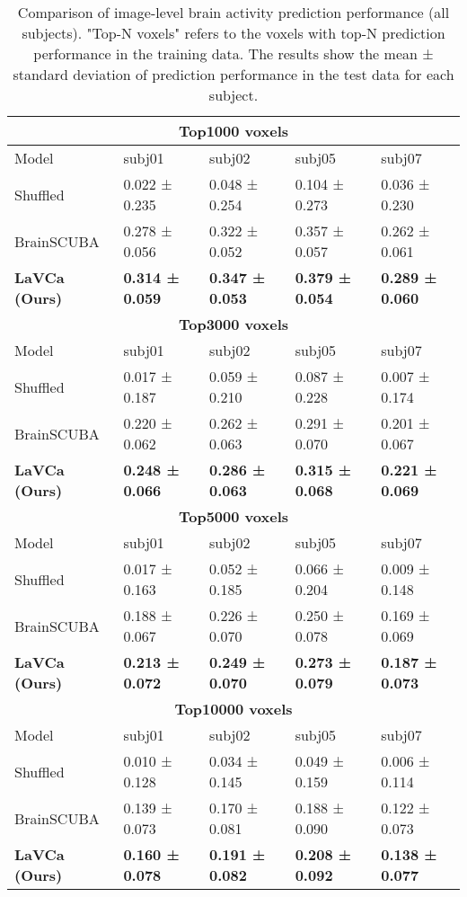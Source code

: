 \clearpage
\begin{table*}[t]
\centering
\caption{Comparison of image-level brain activity prediction performance (all subjects). "Top-N voxels" refers to the voxels with top-N prediction performance in the training data. The results show the mean ± standard deviation of prediction performance in the test data for each subject.}
\vskip 0.15in
\begin{tabular}{lllll}
\toprule
\multicolumn{5}{c}{\textbf{Top1000 voxels}} \\
\midrule
Model & subj01 & subj02 & subj05 & subj07 \\
\midrule
Shuffled & 0.022 ± 0.235 & 0.048 ± 0.254 & 0.104 ± 0.273 & 0.036 ± 0.230 \\
BrainSCUBA & 0.278 ± 0.056 & 0.322 ± 0.052 & 0.357 ± 0.057 & 0.262 ± 0.061 \\
\rowcolor{lavcabg} \textbf{LaVCa (Ours)} & \textbf{0.314 ± 0.059} & \textbf{0.347 ± 0.053} & \textbf{0.379 ± 0.054} & \textbf{0.289 ± 0.060} \\
\midrule
\multicolumn{5}{c}{\textbf{Top3000 voxels}} \\
\midrule
Model & subj01 & subj02 & subj05 & subj07 \\
\midrule
Shuffled & 0.017 ± 0.187 & 0.059 ± 0.210 & 0.087 ± 0.228 & 0.007 ± 0.174 \\
BrainSCUBA & 0.220 ± 0.062 & 0.262 ± 0.063 & 0.291 ± 0.070 & 0.201 ± 0.067 \\
\rowcolor{lavcabg} \textbf{LaVCa (Ours)} & \textbf{0.248 ± 0.066} & \textbf{0.286 ± 0.063} & \textbf{0.315 ± 0.068} & \textbf{0.221 ± 0.069} \\
\midrule
\multicolumn{5}{c}{\textbf{Top5000 voxels}} \\
\midrule
Model & subj01 & subj02 & subj05 & subj07 \\
\midrule
Shuffled & 0.017 ± 0.163 & 0.052 ± 0.185 & 0.066 ± 0.204 & 0.009 ± 0.148 \\
BrainSCUBA & 0.188 ± 0.067 & 0.226 ± 0.070 & 0.250 ± 0.078 & 0.169 ± 0.069 \\
\rowcolor{lavcabg} \textbf{LaVCa (Ours)} & \textbf{0.213 ± 0.072} & \textbf{0.249 ± 0.070} & \textbf{0.273 ± 0.079} & \textbf{0.187 ± 0.073} \\
\midrule
\multicolumn{5}{c}{\textbf{Top10000 voxels}} \\
\midrule
Model & subj01 & subj02 & subj05 & subj07 \\
\midrule
Shuffled & 0.010 ± 0.128 & 0.034 ± 0.145 & 0.049 ± 0.159 & 0.006 ± 0.114 \\
BrainSCUBA & 0.139 ± 0.073 & 0.170 ± 0.081 & 0.188 ± 0.090 & 0.122 ± 0.073 \\
\rowcolor{lavcabg} \textbf{LaVCa (Ours)} & \textbf{0.160 ± 0.078} & \textbf{0.191 ± 0.082} & \textbf{0.208 ± 0.092} & \textbf{0.138 ± 0.077} \\
\bottomrule
\end{tabular}
\label{appendix:TopN_image_acc_comparison}
\end{table*}


